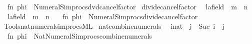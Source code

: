 \begin{isabellebody}
\ \ {\isacartoucheopen}fn\ phi\ {\isacharequal}{\kern0pt}{\isachargreater}{\kern0pt}\ Numeral{\isacharunderscore}{\kern0pt}Simprocs{\isachardot}{\kern0pt}dvd{\isacharunderscore}{\kern0pt}cancel{\isacharunderscore}{\kern0pt}factor{\isacartoucheclose}\isanewline
\isanewline
{}\isamarkupfalse%
\ divide{\isacharunderscore}{\kern0pt}cancel{\isacharunderscore}{\kern0pt}factor\isanewline
\ \ {\isacharparenleft}{\kern0pt}{\isachardoublequoteopen}{\isacharparenleft}{\kern0pt}{\isacharparenleft}{\kern0pt}l{\isacharcolon}{\kern0pt}{\isacharcolon}{\kern0pt}{\isacharprime}{\kern0pt}a{\isacharcolon}{\kern0pt}{\isacharcolon}{\kern0pt}field{\isacharparenright}{\kern0pt}\ {\isacharasterisk}{\kern0pt}\ m{\isacharparenright}{\kern0pt}\ {\isacharslash}{\kern0pt}\ n{\isachardoublequoteclose}\isanewline
\ \ {\isacharbar}{\kern0pt}{\isachardoublequoteopen}{\isacharparenleft}{\kern0pt}l{\isacharcolon}{\kern0pt}{\isacharcolon}{\kern0pt}{\isacharprime}{\kern0pt}a{\isacharcolon}{\kern0pt}{\isacharcolon}{\kern0pt}field{\isacharparenright}{\kern0pt}\ {\isacharslash}{\kern0pt}\ {\isacharparenleft}{\kern0pt}m\ {\isacharasterisk}{\kern0pt}\ n{\isacharparenright}{\kern0pt}{\isachardoublequoteclose}{\isacharparenright}{\kern0pt}\ {\isacharequal}{\kern0pt}\isanewline
\ \ {\isacartoucheopen}fn\ phi\ {\isacharequal}{\kern0pt}{\isachargreater}{\kern0pt}\ Numeral{\isacharunderscore}{\kern0pt}Simprocs{\isachardot}{\kern0pt}divide{\isacharunderscore}{\kern0pt}cancel{\isacharunderscore}{\kern0pt}factor{\isacartoucheclose}\isanewline
\isanewline
{}\isamarkupfalse%
\ {\isacartoucheopen}Tools{\isacharslash}{\kern0pt}nat{\isacharunderscore}{\kern0pt}numeral{\isacharunderscore}{\kern0pt}simprocs{\isachardot}{\kern0pt}ML{\isacartoucheclose}\isanewline
\isanewline
{}\isamarkupfalse%
\ nat{\isacharunderscore}{\kern0pt}combine{\isacharunderscore}{\kern0pt}numerals\isanewline
\ \ {\isacharparenleft}{\kern0pt}{\isachardoublequoteopen}{\isacharparenleft}{\kern0pt}i{\isacharcolon}{\kern0pt}{\isacharcolon}{\kern0pt}nat{\isacharparenright}{\kern0pt}\ {\isacharplus}{\kern0pt}\ j{\isachardoublequoteclose}\ {\isacharbar}{\kern0pt}\ {\isachardoublequoteopen}Suc\ {\isacharparenleft}{\kern0pt}i\ {\isacharplus}{\kern0pt}\ j{\isacharparenright}{\kern0pt}{\isachardoublequoteclose}{\isacharparenright}{\kern0pt}\ {\isacharequal}{\kern0pt}\isanewline
\ \ {\isacartoucheopen}fn\ phi\ {\isacharequal}{\kern0pt}{\isachargreater}{\kern0pt}\ Nat{\isacharunderscore}{\kern0pt}Numeral{\isacharunderscore}{\kern0pt}Simprocs{\isachardot}{\kern0pt}combine{\isacharunderscore}{\kern0pt}numerals{\isacartoucheclose}\isanewline

\end{isabellebody}
